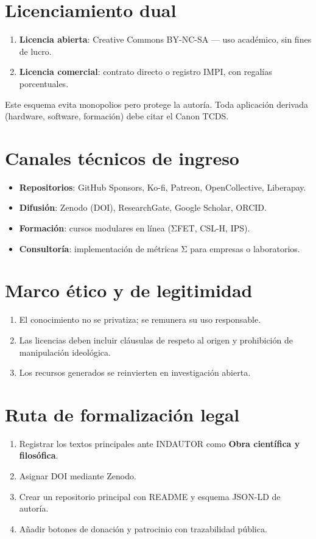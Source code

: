 \documentclass[12pt,letterpaper]{article}
\begin{document}
\section{Licenciamiento dual}
\begin{enumerate}
  \item \textbf{Licencia abierta}: Creative Commons BY-NC-SA — uso académico, sin fines de lucro.
  \item \textbf{Licencia comercial}: contrato directo o registro IMPI, con regalías porcentuales.
\end{enumerate}
Este esquema evita monopolios pero protege la autoría.  
Toda aplicación derivada (hardware, software, formación) debe citar el Canon TCDS.

\section{Canales técnicos de ingreso}
\begin{itemize}
  \item \textbf{Repositorios}: GitHub Sponsors, Ko-fi, Patreon, OpenCollective, Liberapay.
  \item \textbf{Difusión}: Zenodo (DOI), ResearchGate, Google Scholar, ORCID.
  \item \textbf{Formación}: cursos modulares en línea (ΣFET, CSL-H, IPS).
  \item \textbf{Consultoría}: implementación de métricas Σ para empresas o laboratorios.
\end{itemize}

\section{Marco ético y de legitimidad}
\begin{enumerate}
  \item El conocimiento no se privatiza; se remunera su uso responsable.
  \item Las licencias deben incluir cláusulas de respeto al origen y prohibición de manipulación ideológica.
  \item Los recursos generados se reinvierten en investigación abierta.
\end{enumerate}

\section{Ruta de formalización legal}
\begin{enumerate}
  \item Registrar los textos principales ante INDAUTOR como \textbf{Obra científica y filosófica}.
  \item Asignar DOI mediante Zenodo.
  \item Crear un repositorio principal con README y esquema JSON-LD de autoría.
  \item Añadir botones de donación y patrocinio con trazabilidad pública.
\end{enumerate}
\end{document}
